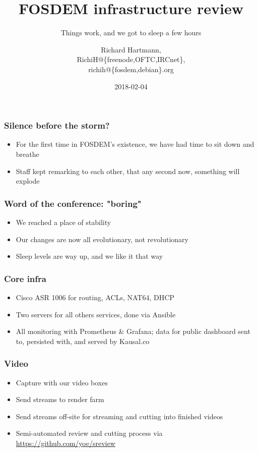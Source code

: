 \documentclass[t]{beamer}
\title{FOSDEM infrastructure review}
\subtitle{Things work, and we got to sleep a few hours}
\author{Richard Hartmann,\\
RichiH@\{freenode,OFTC,IRCnet\},\\
richih@\{fosdem,debian\}.org}
\date{2018-02-04}
\begin{document}
\setcounter{tocdepth}{1}

\begin{frame}
	\titlepage
\end{frame}





\begin{frame}
	\frametitle{Silence before the storm?}
	\vfill
	\begin{itemize}
		\item For the first time in FOSDEM's existence, we have had time to sit down and breathe
		\item Staff kept remarking to each other, that any second now, something will explode
	\end{itemize}
	\vfill
\end{frame}

\begin{frame}
	\frametitle{Word of the conference: "boring"}
	\vfill
	\begin{itemize}
		\item We reached a place of stability
		\item Our changes are now all evolutionary, not revolutionary
		\item Sleep levels are way up, and we like it that way
	\end{itemize}
	\vfill
\end{frame}

\begin{frame}
	\frametitle{Core infra}
	\vfill
	\begin{itemize}
		\item Cisco ASR 1006 for routing, ACLs, NAT64, DHCP
		\item Two servers for all others services, done via Ansible
		\item All monitoring with Prometheus \& Grafana; data for public dashboard sent to, persisted with, and served by Kausal.co
	\end{itemize}
	\vfill
\end{frame}

\begin{frame}
	\frametitle{Video}
	\vfill
	\begin{itemize}
		\item Capture with our video boxes
		\item Send streams to render farm
		\item Send streams off-site for streaming and cutting into finished videos
		\item Semi-automated review and cutting process via \url{https://github.com/yoe/sreview}
	\end{itemize}
	\vfill
\end{frame}
\end{document}
